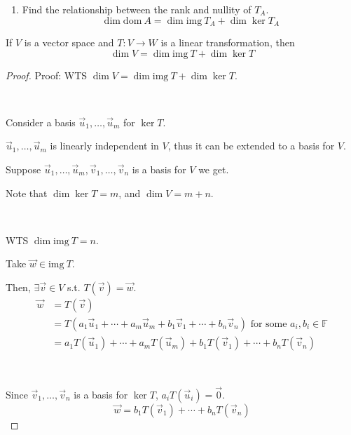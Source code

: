 \documentclass[11pt,fleqn]{book} %
\begin{document}
\begin{example}
\begin{enumerate}
        \item Find the relationship between the rank and nullity of $T_A$. 
        $$\dim \mathrm{dom}~A = \dim \mathrm{img}~T_A + \dim \ker  T_A $$
    \end{enumerate}
\end{example}

\setcounter{section}{3}
\setcounter{dummy}{16}
\begin{theorem}
    If $V$ is a  vector space and $T: V \to W$ is a linear transformation, then $$\dim V = \dim \mathrm{img}~T + \dim \ker T$$
\end{theorem}
\setcounter{section}{2}

\begin{proof}
    Proof: WTS $\dim V = \dim \mathrm{img}~T + \dim \ker T$. 

    {~~~}
    
    Consider a basis $\vec{u}_1, \dots, \vec{u}_m$ for $\ker T$. 
    
    $\vec{u}_1, \dots, \vec{u}_m$ is linearly independent in $V$, thus it can be extended to a basis for $V$. 
    
    Suppose $\vec{u}_1, \dots, \vec{u}_m, \vec{v}_1, \dots, \vec{v}_n$ is a basis for $V$ we get. 

    Note that $\dim \ker T = m$, and $\dim V = m + n$. 
    
    {~~~}

    WTS $\dim \mathrm{img}~T = n$. 
    
    Take $\vec{w} \in \mathrm{img}~T$. 
    
    Then, $\exists \vec{v} \in V$ s.t. $T(\vec{v}) = \vec{w}$. 
    \begin{align*}  
        \vec{w}
        &=T(\vec{v})
        \\
        &= T(a_1\vec{u}_1 + \cdots + a_m\vec{u}_m + b_1\vec{v}_1 + \cdots + b_n\vec{v}_n)
        \text{ for some }a_i, b_i \in \mathbb{F}
        \\
        &= a_1T(\vec{u}_1) + \cdots + a_mT(\vec{u}_m) + b_1T(\vec{v}_1) + \cdots + b_nT(\vec{v}_n)
    \end{align*}
    
    {~~~}

    Since $\vec{v}_1, \dots, \vec{v}_n$ is a basis for $\ker T$, $a_iT(\vec{u}_i) = \vec{0}$. 
    $$\vec{w} = b_1T(\vec{v}_1) + \cdots + b_nT(\vec{v}_n)$$


\end{proof}
\end{document}
